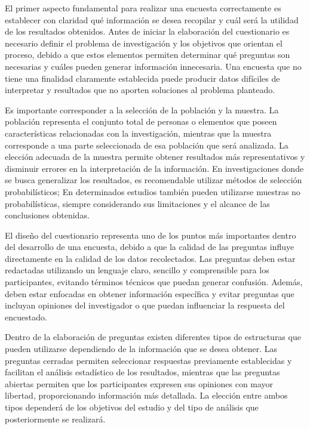\documentclass[12pt,letterpaper]{article}
\begin{document}
El primer aspecto fundamental para realizar una encuesta correctamente es establecer con claridad qué información se desea recopilar y cuál será la utilidad de los resultados obtenidos. Antes de iniciar la elaboración del cuestionario es necesario definir el problema de investigación y los objetivos que orientan el proceso, debido a que estos elementos permiten determinar qué preguntas son necesarias y cuáles pueden generar información innecesaria. Una encuesta que no tiene una finalidad claramente establecida puede producir datos difíciles de interpretar y resultados que no aporten soluciones al problema planteado.

Es importante corresponder a la selección de la población y la muestra. La población representa el conjunto total de personas o elementos que poseen características relacionadas con la investigación, mientras que la muestra corresponde a una parte seleccionada de esa población que será analizada. La elección adecuada de la muestra permite obtener resultados más representativos y disminuir errores en la interpretación de la información. En investigaciones donde se busca generalizar los resultados, es recomendable utilizar métodos de selección probabilísticos; En determinados estudios también pueden utilizarse muestras no probabilísticas, siempre considerando sus limitaciones y el alcance de las conclusiones obtenidas.

El diseño del cuestionario representa uno de los puntos más importantes dentro del desarrollo de una encuesta, debido a que la calidad de las preguntas influye directamente en la calidad de los datos recolectados. Las preguntas deben estar redactadas utilizando un lenguaje claro, sencillo y comprensible para los participantes, evitando términos técnicos que puedan generar confusión. Además, deben estar enfocadas en obtener información específica y evitar preguntas que incluyan opiniones del investigador o que puedan influenciar la respuesta del encuestado.

Dentro de la elaboración de preguntas existen diferentes tipos de estructuras que pueden utilizarse dependiendo de la información que se desea obtener. Las preguntas cerradas permiten seleccionar respuestas previamente establecidas y facilitan el análisis estadístico de los resultados, mientras que las preguntas abiertas permiten que los participantes expresen sus opiniones con mayor libertad, proporcionando información más detallada. La elección entre ambos tipos dependerá de los objetivos del estudio y del tipo de análisis que posteriormente se realizará.
\end{document}
